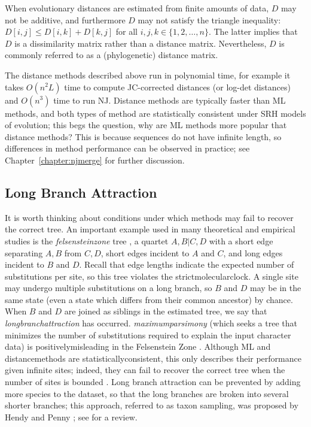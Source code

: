 When evolutionary distances are estimated from finite amounts of data, $D$ may not be additive, and furthermore $D$ may not satisfy the triangle inequality: $D[i,j] \le D[i,k] + D[k,j]$ for all $i, j, k \in \{ 1, 2, \dots, n \}$.
The latter implies that $D$ is a dissimilarity matrix rather than a distance matrix.
Nevertheless, $D$ is commonly referred to as a (phylogenetic) distance matrix.

The distance methods described above run in polynomial time, for example it takes $O(n^2L)$ time to compute JC-corrected distances (or log-det distances) and $O(n^3)$ time to run NJ.
Distance methods are typically faster than \gls{ML}  methods, and both types of method are statistically consistent under SRH models of evolution; this begs the question, why are ML methods more popular that distance methods?
This is because sequences do not have infinite length, so differences in method performance can be observed in practice; see Chapter~\ref{chapter:njmerge} for further discussion.

\subsection{Long Branch Attraction} 
It is worth thinking about conditions under which methods may fail to recover the correct tree.
An important example used in many theoretical and empirical studies is the \textit{\gls{felsensteinzone}} tree \cite{felsenstein1978cases}, a \gls{quartet} $A,B|C,D$ with a short edge separating $A,B$ from $C,D$, short edges incident to $A$ and $C$, and long edges incident to $B$ and $D$.
Recall that edge lengths indicate the expected number of substitutions per site, so this tree violates the \gls{strictmolecularclock}.
A single \gls{site} may undergo multiple substitutions on a long branch, so $B$ and $D$ may be in the same state (even a state which differs from their common ancestor) by chance.
When $B$ and $D$ are joined as siblings in the estimated tree, we say that \textit{\gls{longbranchattraction}} has occurred.
\textit{\Gls{maximumparsimony}} (which seeks a tree that minimizes the number of substitutions required to explain the input character data) is \gls{positivelymisleading} in the Felsenstein Zone \cite{felsenstein1978cases}.
Although \gls{ML} and \glspl{distancemethod} are \gls{statisticallyconsistent}, this only describes their performance given infinite sites; indeed, they can fail to recover the correct tree when the number of sites is bounded \cite{roch2018long}.
Long branch attraction can be prevented by adding more species to the dataset, so that the long branches are broken into several shorter branches; this approach, referred to as taxon sampling, was proposed by Hendy and Penny \cite{hendy1989framework}; see \cite{heath2008taxon} for a review.

